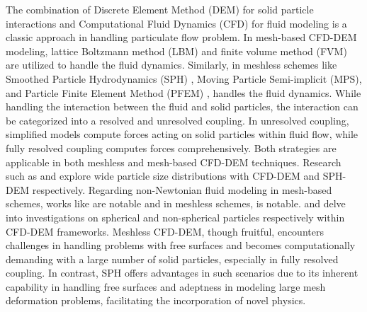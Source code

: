 \documentclass[preprint,12pt]{elsarticle}
\begin{document}
The combination of Discrete Element Method (DEM) for solid particle
interactions and Computational Fluid Dynamics (CFD) for fluid modeling
is a classic approach in handling particulate flow problem. In
mesh-based CFD-DEM modeling, lattice Boltzmann method (LBM)
\cite{xiong2014lbm} and finite volume method (FVM) \cite{kloss2012models} are
utilized to handle the fluid dynamics. Similarly, in meshless schemes like
Smoothed Particle Hydrodynamics (SPH) \cite{peng2021fully},
Moving Particle Semi-implicit (MPS), and Particle Finite Element
Method (PFEM) \cite{li2019modeling, franci2020pfem}, handles the fluid
dynamics.  While handling the interaction between the fluid and solid
particles, the interaction can be categorized into a resolved and unresolved
coupling. In unresolved coupling, simplified models compute forces acting on
solid particles within fluid flow, while fully resolved coupling computes
forces comprehensively. Both strategies are applicable in both meshless
\cite{cleary2015prediction, trujillo2020smooth} and mesh-based
\cite{van2008numerical, ma2022review} CFD-DEM techniques. Research such as
\cite{brosh2014accelerating} and \cite{peng2021fully} explore wide particle
size distributions with CFD-DEM and SPH-DEM respectively.  Regarding
non-Newtonian fluid modeling in mesh-based schemes, works like
\cite{li2018dam} are notable and in meshless schemes, \cite{peng2021fully} is
notable. \citet{zhu2008discrete} and \citet{ma2022review}
delve into investigations on spherical and non-spherical particles
respectively within CFD-DEM frameworks.  Meshless CFD-DEM, though fruitful,
encounters challenges in handling problems with free surfaces and becomes
computationally demanding with a large number of solid particles, especially
in fully resolved coupling. In contrast, SPH offers advantages in such
scenarios due to its inherent capability in handling free surfaces and
adeptness in modeling large mesh deformation problems, facilitating the
incorporation of novel physics.
\end{document}
